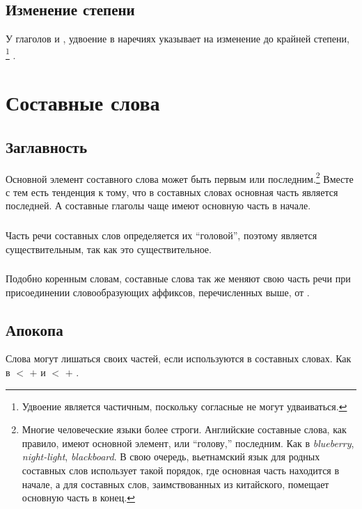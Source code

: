 \subsection{Изменение степени} У глаголов   и
 , удвоение в наречиях указывает на изменение до крайней степени,  
\footnote{Удвоение является частичным, поскольку согласные не могут удваиваться.} .\\

\newpage
\section{Составные слова}

\subsection{Заглавность} Основной элемент составного слова может быть первым или последним.\footnote{Многие человеческие языки более строги.  Английские составные слова, как правило, имеют основной элемент, или ``голову,'' последним. Как в \textit{blueberry},
\textit{night-light}, \textit{blackboard}.  В свою очередь, вьетнамский язык для родных составных слов использует такой порядок, где основная часть находится в начале, а для составных слов, заимствованных из китайского, помещает основную часть в конец.}  Вместе с тем есть тенденция к тому, что в составных словах основная часть является последней.  А составные глаголы чаще имеют основную часть в начале.

\subsubsection{} Часть речи составных слов определяется их ``головой'',
поэтому   является существительным, так как   это существительное.

\subsubsection{} Подобно коренным словам, составные слова так же меняют свою часть речи при присоединении словообразующих аффиксов, перечисленных выше,
  от  .


\subsection{Апокопа} Слова могут лишаться своих частей, если используются в составных словах. Как в   $<$   $+$
  и   $<$
  $+$  .


